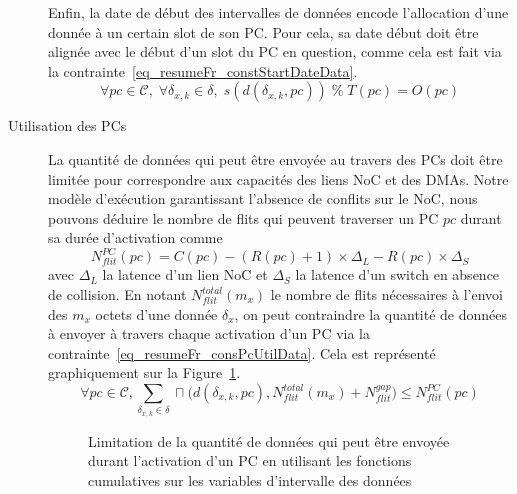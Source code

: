 \documentclass[main.tex]{subfiles}
\begin{document}
\begin{description}
        Enfin, la date de début des intervalles de données encode l'allocation d'une donnée à un certain slot de son PC. Pour cela, sa date début doit être alignée avec le début d'un slot du PC en question, comme cela est fait via la contrainte~\ref{eq_resumeFr_constStartDateData}.
\begin{equation}
    \label{eq_resumeFr_constStartDateData}
    \forall pc \in \mathcal{C}, \; \forall \delta_{x,k} \in \delta, \; 
    s( d( \delta_{x,k}, pc ) ) \; \% \; T(pc) = O(pc)
\end{equation}


    \item[Utilisation des PCs]


        La quantité de données qui peut être envoyée au travers des PCs doit être limitée pour correspondre aux capacités des liens NoC et des DMAs. Notre modèle d'exécution garantissant l'absence de conflits sur le NoC, nous pouvons déduire le nombre de flits qui peuvent traverser un PC $pc$ durant sa durée d'activation comme
\begin{displaymath}
    N_{flit}^{PC} (pc) = C(pc) - (R(pc) + 1) \times \Delta_L - R(pc)\times \Delta_S 
\end{displaymath}
avec $\Delta_L$ la latence d'un lien NoC et $\Delta_S$ la latence d'un switch en absence de collision. En notant $N_{flit}^{total}(m_x)$ le nombre de flits nécessaires à l'envoi des $m_x$ octets d'une donnée $\delta_x$, on peut contraindre la quantité de données à envoyer à travers chaque activation d'un PC via la contrainte~\ref{eq_resumeFr_consPcUtilData}. Cela est représenté graphiquement sur la Figure~\ref{fig_resumeFr_consPcUtilData}.
\begin{equation}
    \label{eq_resumeFr_consPcUtilData}
    \forall pc \in \mathcal{C} , 
    \sum_{\delta_{x,k} \in \delta} \sqcap \Big( d(\delta_{x,k} , pc) , N_{flit}^{total}(m_x) + N_{flit}^{gap} \Big) \leq N_{flit}^{PC} (pc)
\end{equation}

\begin{figure}
    \centering
    \scalebox{0.9}{}
    \caption{Limitation de la quantité de données qui peut être envoyée durant l'activation d'un PC en utilisant les fonctions cumulatives sur les variables d'intervalle des données}
    \label{fig_resumeFr_consPcUtilData}
\end{figure}


\end{description}
\end{document}
